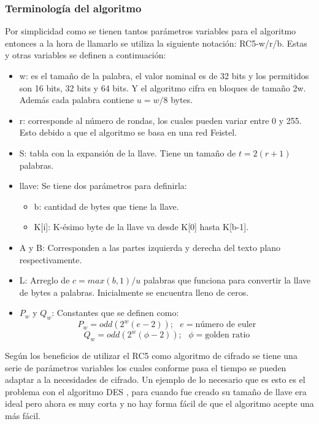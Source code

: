\subsubsection{Terminología del algoritmo}
Por simplicidad como se tienen tantos parámetros variables para el algoritmo entonces a la hora de llamarlo se utiliza la siguiente notación: RC5-w/r/b. Estas y otras variables se definen a continuación:

\begin{itemize}
\item w: es el tamaño de la palabra, el valor nominal es de 32 bits y los permitidos son 16 bits, 32 bits y 64 bits. Y el algoritmo cifra en bloques de tamaño 2w. Además cada palabra contiene $u=w/8$ bytes.

\item r: corresponde al número de rondas, los cuales pueden variar entre 0 y 255. Esto debido a que el algoritmo se basa en una red Feistel.
 
\item S: tabla con la expansión de la llave. Tiene un tamaño de $t= 2(r+1)$ palabras.

\item llave: Se tiene dos parámetros para definirla:
\begin{itemize}
\item b: cantidad de bytes que tiene la llave.
\item K[i]: K-ésimo byte de la llave va desde K[0] hasta K[b-1].
\end{itemize}

\item A y B: Corresponden a las partes izquierda y derecha del texto plano respectivamente.

\item L: Arreglo de $c=max(b,1)/u$ palabras que funciona para convertir la llave de bytes a palabras. Inicialmente se encuentra lleno de ceros.

\item $P_w$ y $Q_w$: Constantes que se definen como:
\begin{equation}
P_w = odd(2^w(e-2)); \text{   }e = \text{número de euler}
\end{equation}
\begin{equation}
Q_w = odd(2^w(\phi-2));\text{   } \phi = \text{golden ratio}
\end{equation}
\end{itemize}



Según \cite{rivest} los beneficios de utilizar el RC5 como algoritmo de cifrado se tiene una serie de parámetros variables los cuales conforme pasa el tiempo se pueden adaptar a la necesidades de cifrado. Un ejemplo de lo necesario que es esto es el problema con el algoritmo DES , para cuando fue creado su tamaño de llave era ideal pero ahora es muy corta y no hay forma fácil de que el algoritmo acepte una más fácil.

